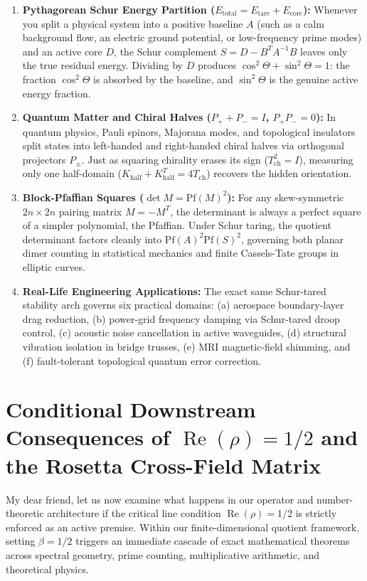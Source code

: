 \documentclass[11pt,a4paper]{article}
\begin{document}
\begin{enumerate}
  \item \textbf{Pythagorean Schur Energy Partition ($E_{\mathrm{total}} = E_{\mathrm{tare}} + E_{\mathrm{core}}$):} Whenever you split a physical system into a positive baseline $A$ (such as a calm background flow, an electric ground potential, or low-frequency prime modes) and an active core $D$, the Schur complement $S = D - B^T A^{-1} B$ leaves only the true residual energy. Dividing by $D$ produces $\cos^2\Theta + \sin^2\Theta = 1$: the fraction $\cos^2\Theta$ is absorbed by the baseline, and $\sin^2\Theta$ is the genuine active energy fraction.
  \item \textbf{Quantum Matter and Chiral Halves ($P_+ + P_- = I$, $P_+ P_- = 0$):} In quantum physics, Pauli spinors, Majorana modes, and topological insulators split states into left-handed and right-handed chiral halves via orthogonal projectors $P_\pm$. Just as squaring chirality erases its sign ($T_{\mathrm{ch}}^2 = I$), measuring only one half-domain ($K_{\mathrm{half}} + K_{\mathrm{half}}^T = 4 T_{\mathrm{ch}}$) recovers the hidden orientation.
  \item \textbf{Block-Pfaffian Squares ($\det M = \mathrm{Pf}(M)^2$):} For any skew-symmetric $2n \times 2n$ pairing matrix $M = -M^T$, the determinant is always a perfect square of a simpler polynomial, the Pfaffian. Under Schur taring, the quotient determinant factors cleanly into $\mathrm{Pf}(A)^2 \mathrm{Pf}(S)^2$, governing both planar dimer counting in statistical mechanics and finite Cassels-Tate groups in elliptic curves.
  \item \textbf{Real-Life Engineering Applications:} The exact same Schur-tared stability arch governs six practical domains: (a) aerospace boundary-layer drag reduction, (b) power-grid frequency damping via Schur-tared droop control, (c) acoustic noise cancellation in active waveguides, (d) structural vibration isolation in bridge trusses, (e) MRI magnetic-field shimming, and (f) fault-tolerant topological quantum error correction.
\end{enumerate}


\section{Conditional Downstream Consequences of $\operatorname{Re}(\rho) = 1/2$ and the Rosetta Cross-Field Matrix}

My dear friend, let us now examine what happens in our operator and number-theoretic architecture if the critical line condition $\operatorname{Re}(\rho) = 1/2$ is strictly enforced as an active premise. Within our finite-dimensional quotient framework, setting $\beta = 1/2$ triggers an immediate cascade of exact mathematical theorems across spectral geometry, prime counting, multiplicative arithmetic, and theoretical physics.
\end{document}

